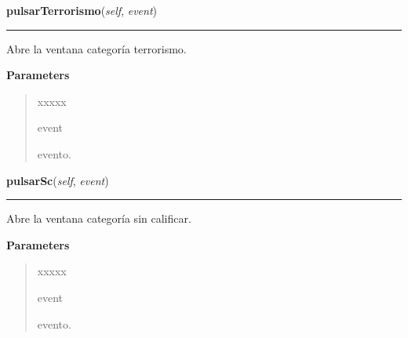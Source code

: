     \label{informacion:Informacion:pulsarTerrorismo}

    \vspace{0.5ex}

\hspace{.8\funcindent}\begin{boxedminipage}{\funcwidth}

    \raggedright \textbf{pulsarTerrorismo}(\textit{self}, \textit{event})

    \vspace{-1.5ex}

    \rule{\textwidth}{0.5\fboxrule}
\setlength{\parskip}{2ex}
    Abre la ventana categoría terrorismo.

\setlength{\parskip}{1ex}
      \textbf{Parameters}
      \vspace{-1ex}

      \begin{quote}
        \begin{Ventry}{xxxxx}

          \item[event]

          evento.

        \end{Ventry}

      \end{quote}

    \end{boxedminipage}

    \label{informacion:Informacion:pulsarSc}

    \vspace{0.5ex}

\hspace{.8\funcindent}\begin{boxedminipage}{\funcwidth}

    \raggedright \textbf{pulsarSc}(\textit{self}, \textit{event})

    \vspace{-1.5ex}

    \rule{\textwidth}{0.5\fboxrule}
\setlength{\parskip}{2ex}
    Abre la ventana categoría sin calificar.

\setlength{\parskip}{1ex}
      \textbf{Parameters}
      \vspace{-1ex}

      \begin{quote}
        \begin{Ventry}{xxxxx}

          \item[event]

          evento.

        \end{Ventry}

      \end{quote}

    \end{boxedminipage}


